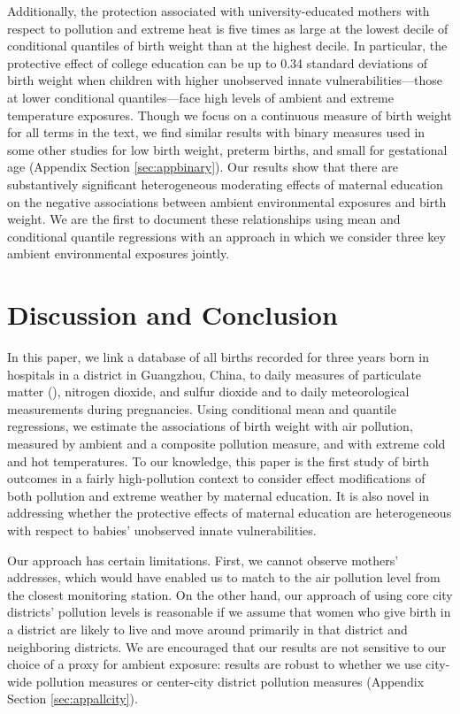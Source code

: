 Additionally, the protection associated with university-educated mothers with respect to pollution and extreme heat is five times as large at the lowest decile of conditional quantiles of birth weight than at the highest decile. In particular, the protective effect of college
education can be up to 0.34 standard deviations of birth weight when
children with higher unobserved innate vulnerabilities---those at
lower conditional quantiles---face high levels of ambient \PARPMTEN and
extreme temperature exposures.  Though we focus on a continuous measure of birth weight for all terms in the text, we find similar results with binary measures used in some other studies for low birth weight, preterm births, and small for gestational age (Appendix Section \ref{sec:appbinary}). Our results show that there are substantively significant heterogeneous moderating effects of maternal education on the negative associations between ambient environmental exposures and birth weight. We are the first to document these relationships using mean and conditional quantile regressions with an approach in which we consider three key ambient environmental exposures jointly. 

\section{Discussion and Conclusion \label{summary-and-conclusions}}


In this paper, we link a database of all births recorded for three years
born in hospitals in a district in Guangzhou, China, to daily measures of particulate
matter (\PARPMTEN), nitrogen dioxide, and sulfur dioxide and to daily
meteorological measurements during pregnancies. Using conditional mean
and quantile regressions, we estimate the associations of birth weight
with air pollution, measured by ambient \PARPMTEN and a composite pollution
measure, and with extreme cold and hot temperatures. To our knowledge, this paper is the first study of birth outcomes in a fairly high-pollution context to consider effect modifications of both pollution and extreme weather by maternal education. It is also novel in addressing whether the protective effects of
maternal education are heterogeneous with respect to babies' unobserved innate vulnerabilities. 

Our approach has certain limitations.  First, we cannot observe mothers' addresses, which would have enabled us to match to the air pollution level from the closest monitoring station. On the other hand, our approach of using core city districts' pollution levels is reasonable if we assume that women who give birth in a district are likely to live and move around primarily in that district and neighboring districts. We are encouraged that our results are not sensitive to our choice of a proxy for ambient exposure: results are robust to whether we use city-wide pollution measures or center-city district pollution measures (Appendix Section \ref{sec:appallcity}). 

